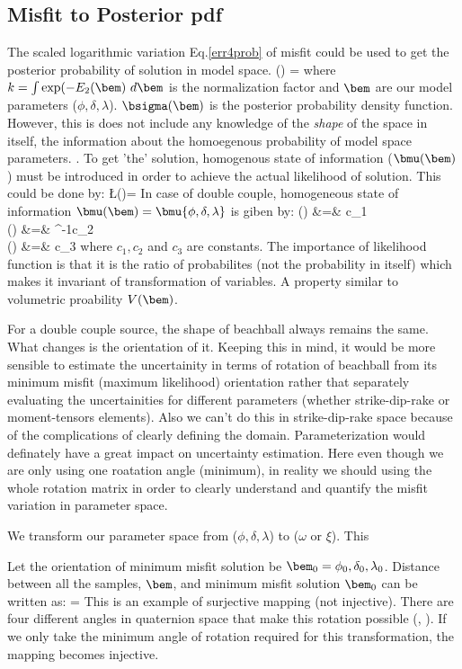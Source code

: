 \documentclass[11pt,titlepage,fleqn]{article}
\begin{document}
\subsection{Misfit to Posterior pdf}
The scaled logarithmic variation Eq.\ref{err4prob} of misfit could be used to get the posterior probability of solution in model space. 
\eq
\sigma(\bem) = 
\en
where $k = \int \exp (-E_2(\bem)\ d\bem$ is the normalization factor and $\bem$ are our model parameters ($\phi,\delta,\lambda$). $\bsigma(\bem)$ is the posterior probability density function. However, this is does not include any knowledge of the {\it shape} of the space in itself, \ie the information about the homoegenous probability of model space parameters. \citep{Tarantola_2006}. To get 'the' solution, homogenous state of information ($\bmu(\bem)$) must be introduced in order to achieve the actual likelihood of solution. This could be done by:
\eq
\L(\bem)=\frac{\bsigma(\bem)}{\bmu(\bem)}
\en
In case of double couple, homogeneous state of information $\bmu(\bem) = \bmu{\phi,\delta,\lambda}$ is giben by:
\eqa
\mu(\phi) &=& c_1\\
\mu(\delta) &=& \cos^{-1}c_2\\
\mu(\lambda) &=& c_3
\ena
where $c_1, c_2$ and $c_3$ are constants.
The importance of likelihood function is that it is the ratio of probabilites (not the probability in itself) which makes it invariant of transformation of variables. A property similar to volumetric proability $V(\bem)$.

For a double couple source, the shape of beachball always remains the same. What changes is the orientation of it. Keeping this in mind, it would be more sensible to estimate the uncertainity in terms of rotation of beachball from its minimum misfit (maximum likelihood) orientation rather that separately evaluating the uncertainities for different parameters (whether strike-dip-rake or moment-tensors elements). Also we can't do this in strike-dip-rake space because of the complications of clearly defining the domain. Parameterization would definately have a great impact on uncertainty estimation. Here even though we are only using one roatation angle (minimum), in reality we should using the whole rotation matrix in order to clearly understand and quantify the misfit variation in parameter space.

We transform our parameter space from ($\phi,\delta,\lambda$) to ($\omega$ or $\xi$). This 

Let the orientation of minimum misfit solution be $\bem_0 = {\phi_0, \delta_0, \lambda_0}$. Distance between all the samples, $\bem$, and minimum misfit solution $\bem_0$ can be written as:
 = \bxi
\en
This is an example of surjective mapping (not injective). There are four different angles in quaternion space that make this rotation possible (\cite{Kagan1991}, \cite{TapeTape2012kagan}). If we only take the minimum angle of rotation required for this transformation, the mapping becomes injective.
\end{document}
